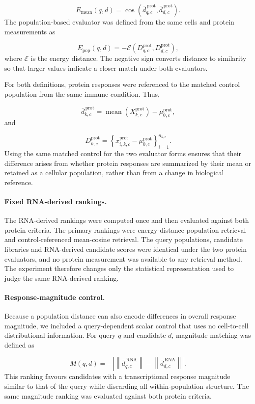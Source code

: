\documentclass[11pt,letterpaper]{article}
\begin{document}
\[
E_{\mathrm{mean}}(q,d)
=
\cos
\left(
\bar d^{\,\mathrm{prot}}_{q,c},
\bar d^{\,\mathrm{prot}}_{d,c}
\right).
\]
The population-based evaluator was defined from the same cells and protein measurements as

\[
E_{\mathrm{pop}}(q,d)
=
-
\mathcal{E}
\left(
D^{\mathrm{prot}}_{q,c},
D^{\mathrm{prot}}_{d,c}
\right),
\]
where $\mathcal{E}$ is the energy distance. The negative sign converts distance to similarity
so that larger values indicate a closer match under both evaluators.

For both definitions, protein responses were referenced to the matched control population from
the same immune condition. Thus,

\[
\bar d^{\,\mathrm{prot}}_{k,c}
=
\operatorname{mean}
\left(
X^{\mathrm{prot}}_{k,c}
\right)
-
\mu^{\mathrm{prot}}_{0,c},
\]
and

\[
D^{\mathrm{prot}}_{k,c}
=
\left\{
x^{\mathrm{prot}}_{i,k,c}
-
\mu^{\mathrm{prot}}_{0,c}
\right\}_{i=1}^{n_{k,c}}.
\]
Using the same matched control for the two evaluator forms ensures that their difference arises
from whether protein responses are summarized by their mean or retained as a cellular population,
rather than from a change in biological reference.

\paragraph{Fixed RNA-derived rankings.}
The RNA-derived rankings were computed once and then evaluated against both protein criteria.
The primary rankings were energy-distance population retrieval and control-referenced
mean-cosine retrieval. The query populations, candidate libraries and RNA-derived candidate
scores were identical under the two protein evaluators, and no protein measurement was available
to any retrieval method. The experiment therefore changes only the statistical representation
used to judge the same RNA-derived ranking.

\paragraph{Response-magnitude control.}
Because a population distance can also encode differences in overall response magnitude, we
included a query-dependent scalar control that uses no cell-to-cell distributional information.
For query $q$ and candidate $d$, magnitude matching was defined as

\[
M(q,d)
=
-
\left|
\left\|
\bar d^{\,\mathrm{RNA}}_{q,c}
\right\|
-
\left\|
\bar d^{\,\mathrm{RNA}}_{d,c}
\right\|
\right|.
\]
This ranking favours candidates with a transcriptional response magnitude similar to that of the
query while discarding all within-population structure. The same magnitude ranking was evaluated
against both protein criteria.
\end{document}
